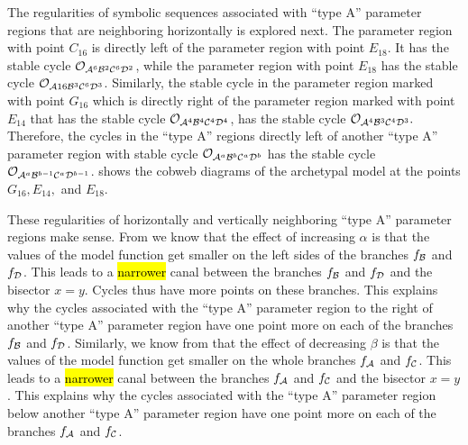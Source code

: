 The regularities of symbolic sequences associated with ``type A'' parameter regions that are neighboring horizontally is explored next.
The parameter region with point $C_{16}$ is directly left of the parameter region with point $E_{18}$.
It has the stable cycle $\mathcal{O}_{\mathcal{A}^6\mathcal{B}^2\mathcal{C}^6\mathcal{D}^2}$, while the parameter region with point $E_{18}$ has the stable cycle $\mathcal{O}_{\mathcal{A}16\mathcal{B}^3\mathcal{C}^6\mathcal{D}^3}$.
Similarly, the stable cycle in the parameter region marked with point $G_{16}$ which is directly right of the parameter region marked with point $E_{14}$ that has the stable cycle $\mathcal{O}_{\mathcal{A}^4\mathcal{B}^4\mathcal{C}^4\mathcal{D}^4}$, has the stable cycle $\mathcal{O}_{\mathcal{A}^4\mathcal{B}^3\mathcal{C}^4\mathcal{D}^3}.$
Therefore, the cycles in the ``type A'' regions directly left of another ``type A'' parameter region with stable cycle $\mathcal{O}_{\mathcal{A}^a\mathcal{B}^b\mathcal{C}^a\mathcal{D}^b}$ has the stable cycle $\mathcal{O}_{\mathcal{A}^a\mathcal{B}^{b-1}\mathcal{C}^a\mathcal{D}^{b-1}}$.
 shows the cobweb diagrams of the archetypal model at the points $G_{16}, E_{14},$ and $E_{18}$.

These regularities of horizontally and vertically neighboring ``type A'' parameter regions make sense.
From  we know that the effect of increasing $\alpha$ is that the values of the model function get smaller on the left sides of the branches $f_{\mathcal{B}}$ and $f_{\mathcal{D}}$.
This leads to a \hl{narrower} canal between the branches $f_{\mathcal{B}}$ and $f_{\mathcal{D}}$ and the bisector $x = y$.
Cycles thus have more points on these branches.
This explains why the cycles associated with the ``type A'' parameter region to the right of another ``type A'' parameter region have one point more on each of the branches $f_{\mathcal{B}}$ and $f_{\mathcal{D}}$.
Similarly, we know from  that the effect of decreasing $\beta$ is that the values of the model function get smaller on the whole branches $f_{\mathcal{A}}$ and $f_{\mathcal{C}}$.
This leads to a \hl{narrower} canal between the branches $f_{\mathcal{A}}$ and $f_{\mathcal{C}}$ and the bisector $x = y$.
This explains why the cycles associated with the ``type A'' parameter region below another ``type A'' parameter region have one point more on each of the branches $f_{\mathcal{A}}$ and $f_{\mathcal{C}}$.

